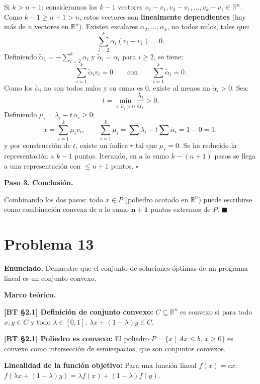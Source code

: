 \documentclass{article}
\newenvironment{marco}{\begin{mdframed}[linecolor=black!40,backgroundcolor=gray!5]\small\textbf{Marco teórico.}\par\smallskip}{\end{mdframed}\medskip}
\begin{document}
Si $k > n+1$: consideramos los $k-1$ vectores $v_2 - v_1, v_3 - v_1, \ldots, v_k - v_1 \in \mathbb{R}^n$. Como $k - 1 \geq n + 1 > n$, estos vectores son \textbf{linealmente dependientes} (hay más de $n$ vectores en $\mathbb{R}^n$). Existen escalares $\alpha_2, \ldots, \alpha_k$, no todos nulos, tales que:
\[
  \sum_{i=2}^{k} \alpha_i (v_i - v_1) = 0.
\]
Definiendo $\tilde{\alpha}_1 = -\sum_{i=2}^k \alpha_i$ y $\tilde{\alpha}_i = \alpha_i$ para $i \geq 2$, se tiene:
\[
  \sum_{i=1}^{k} \tilde{\alpha}_i v_i = 0 \qquad \text{con} \qquad \sum_{i=1}^{k} \tilde{\alpha}_i = 0.
\]
Como los $\tilde{\alpha}_i$ no son todos nulos y su suma es $0$, existe al menos un $\tilde{\alpha}_i > 0$. Sea:
\[
  t = \min_{i:\, \tilde{\alpha}_i > 0} \frac{\lambda_i}{\tilde{\alpha}_i} > 0.
\]
Definiendo $\mu_i = \lambda_i - t\, \tilde{\alpha}_i \geq 0$:
\[
  x = \sum_{i=1}^{k} \mu_i v_i, \qquad \sum_{i=1}^k \mu_i = \sum \lambda_i - t\sum \tilde{\alpha}_i = 1 - 0 = 1,
\]
y por construcción de $t$, existe un índice $r$ tal que $\mu_r = 0$. Se ha reducido la representación a $k-1$ puntos. Iterando, en a lo sumo $k - (n+1)$ pasos se llega a una representación con $\leq n+1$ puntos. $\square$

\textbf{Paso 3. Conclusión.}

Combinando los dos pasos: todo $x \in P$ (poliedro acotado en $\mathbb{R}^n$) puede escribirse como combinación convexa de a lo sumo $\mathbf{n+1}$ puntos extremos de $P$. $\blacksquare$

\section*{Problema 13}

\textbf{Enunciado.} Demuestre que el conjunto de soluciones óptimas de un programa lineal es un conjunto convexo.

\begin{marco}
\textbf{[BT §2.1] Definición de conjunto convexo:} $C \subseteq \mathbb{R}^n$ es convexo si para todo $x, y \in C$ y todo $\lambda \in [0,1]$: $\lambda x + (1-\lambda)y \in C$.

\textbf{[BT §2.1] Poliedro es convexo:} El poliedro $P = \{x \mid Ax \leq b,\, x \geq 0\}$ es convexo como intersección de semiespacios, que son conjuntos convexos.

\textbf{Linealidad de la función objetivo:} Para una función lineal $f(x) = cx$: $f(\lambda x + (1-\lambda)y) = \lambda f(x) + (1-\lambda)f(y)$.
\end{marco}
\end{document}
